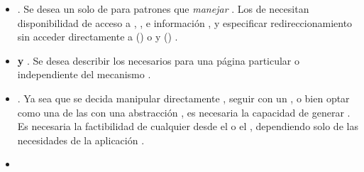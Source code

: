 \begin{itemize}
	\item
		\textbf{\routingAS}. Se desea un solo \setPL de \routesPC para \mapCPT patrones \uriNAME que \textit{manejar} \routePC. Los \handlersAS de \routePC necesitan disponibilidad de acceso a \httpNAME \headersINT, \cookiesINT, e información \uriNAME, y especificar redireccionamiento sin acceder directamente a \windowLocationINT(\browserINT) o \reqNodeINT y \resNodeINT (\nodejsNAME) \cite{online_isom_js_future_web_apps}.
	\item
		\textbf{\fetchingPC y \persistingPC \dataPC}. Se desea describir los \resourcesCPT necesarios para \renderCPT una página particular o \componentAS independiente del mecanismo \fetchingPC \cite{online_isom_js_future_web_apps}.
	\item
		\textbf{\viewRenderingAS}. Ya sea que se decida manipular directamente \htmldomNAME, seguir con un \templatingAS \htmlNAME \stringBasePL, o bien optar como una de las \componentsAS \uiSiglaAS con una abstracción \htmldomNAME, es necesaria la capacidad de generar \markupPL \isomorphicallyAS. Es necesaria la factibilidad de \renderCPT cualquier \viewAS desde el \serverAS o el \clientAS, dependiendo solo de las necesidades de la aplicación \cite{online_isom_js_future_web_apps}.
	\item

\end{itemize}
